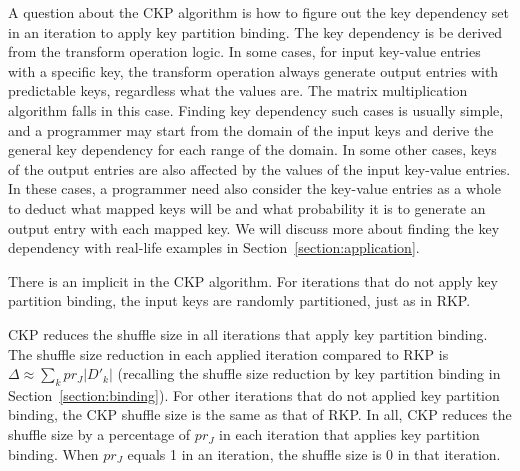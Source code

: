 \documentclass[10pt,journal,compsoc]{IEEEtran}
\makeatletter
\newcommand{\removelatexerror}{\let\@latex@error\@gobble}
\makeatother
\begin{document}
A question about the CKP algorithm is how to figure out the key dependency set in an iteration to apply key partition binding. 
The key dependency is be derived from the transform operation logic. 
In some cases, for input key-value entries with a specific key, 
the transform operation always generate output entries with predictable keys, 
regardless what the values are. 
The matrix multiplication algorithm falls in this case. 
Finding key dependency such cases is usually simple, 
and a programmer may start from the domain of the input keys and 
derive the general key dependency for each range of the domain.
In some other cases, keys of the output entries are also affected by 
the values of the input key-value entries. 
In these cases, a programmer need also consider the key-value entries as 
a whole to deduct what mapped keys will be and what probability it is
to generate an output entry with each mapped key.
We will discuss more about finding the key dependency with real-life examples in Section~\ref{section:application}.

There is an implicit in the CKP algorithm. 
For iterations that do not apply key partition binding, 
the input keys are randomly partitioned, just as in RKP.

CKP reduces the shuffle size in all iterations that apply key partition binding.
The shuffle size reduction in each applied iteration compared to RKP is $ \Delta \approx \sum_k pr_J |D'_k|$ (recalling the shuffle size reduction by 
key partition binding in Section~\ref{section:binding}). 
For other iterations that do not applied key partition binding, 
the CKP shuffle size is the same as that of RKP.
In all, CKP reduces the shuffle size by a percentage of $pr_J$ in each 
iteration that applies key partition binding. 
When $pr_J$ equals 1 in an iteration, the shuffle size is 0 in that iteration.




\end{document}
